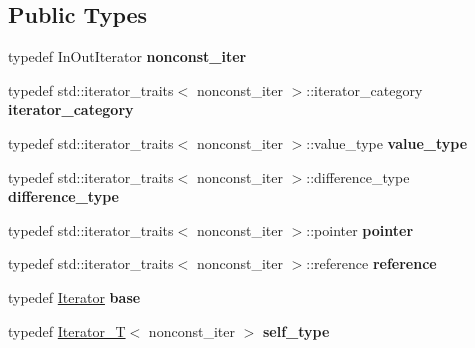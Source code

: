 \subsection*{Public Types}
\begin{DoxyCompactItemize}
\item 
typedef In\+Out\+Iterator {\bfseries nonconst\+\_\+iter}\hypertarget{classswig_1_1Iterator__T_a0d9b52aaa1d69b87958b8e9acf89744a}{}\label{classswig_1_1Iterator__T_a0d9b52aaa1d69b87958b8e9acf89744a}

\item 
typedef std\+::iterator\+\_\+traits$<$ nonconst\+\_\+iter $>$\+::iterator\+\_\+category {\bfseries iterator\+\_\+category}\hypertarget{classswig_1_1Iterator__T_ae734ba26efa22f6d9a1ea0a92b2a858d}{}\label{classswig_1_1Iterator__T_ae734ba26efa22f6d9a1ea0a92b2a858d}

\item 
typedef std\+::iterator\+\_\+traits$<$ nonconst\+\_\+iter $>$\+::value\+\_\+type {\bfseries value\+\_\+type}\hypertarget{classswig_1_1Iterator__T_a7e268cdfeb3d6ee2f4ca6209b5738bab}{}\label{classswig_1_1Iterator__T_a7e268cdfeb3d6ee2f4ca6209b5738bab}

\item 
typedef std\+::iterator\+\_\+traits$<$ nonconst\+\_\+iter $>$\+::difference\+\_\+type {\bfseries difference\+\_\+type}\hypertarget{classswig_1_1Iterator__T_a30112ac98af1a4180707a4a98f90e308}{}\label{classswig_1_1Iterator__T_a30112ac98af1a4180707a4a98f90e308}

\item 
typedef std\+::iterator\+\_\+traits$<$ nonconst\+\_\+iter $>$\+::pointer {\bfseries pointer}\hypertarget{classswig_1_1Iterator__T_a5700ee8d0641ce9ad805f505e18e5439}{}\label{classswig_1_1Iterator__T_a5700ee8d0641ce9ad805f505e18e5439}

\item 
typedef std\+::iterator\+\_\+traits$<$ nonconst\+\_\+iter $>$\+::reference {\bfseries reference}\hypertarget{classswig_1_1Iterator__T_a745ec8bc8f6846e156bea612e6138548}{}\label{classswig_1_1Iterator__T_a745ec8bc8f6846e156bea612e6138548}

\item 
typedef \hyperlink{structswig_1_1Iterator}{Iterator} {\bfseries base}\hypertarget{classswig_1_1Iterator__T_a15add9d6be6e936836d3dbbfd0cfedae}{}\label{classswig_1_1Iterator__T_a15add9d6be6e936836d3dbbfd0cfedae}

\item 
typedef \hyperlink{classswig_1_1Iterator__T}{Iterator\+\_\+T}$<$ nonconst\+\_\+iter $>$ {\bfseries self\+\_\+type}\hypertarget{classswig_1_1Iterator__T_adbd066158fad2ccfd042764ad7b2a026}{}\label{classswig_1_1Iterator__T_adbd066158fad2ccfd042764ad7b2a026}

\end{DoxyCompactItemize}

